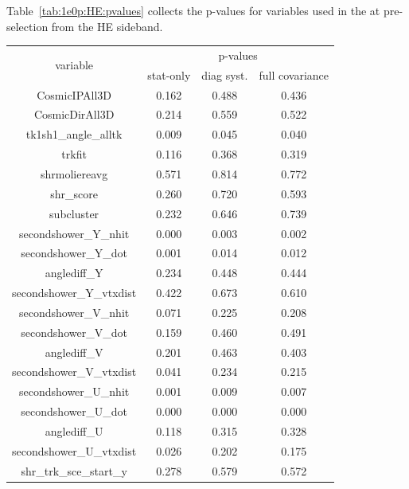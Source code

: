 Table~\ref{tab:1e0p:HE:pvalues} collects the p-values for variables used in the \zpsel at pre-selection from the HE sideband.

\begin{table}[H]
\centering
\setlength{\tabcolsep}{10pt}
\renewcommand{\arraystretch}{1.25}
\begin{tabular}{| c | c | c | c | } 
 \hline
\multirow{2}{*}{variable} & \multicolumn{3}{c|}{p-values} \\
\cline{2-4} & stat-only & diag syst. & full covariance \\ \hline
CosmicIPAll3D & 0.162 & 0.488 & 0.436 \\ \hline
CosmicDirAll3D & 0.214 & 0.559 & 0.522 \\ \hline
tk1sh1\_angle\_alltk & 0.009 & 0.045 & 0.040 \\ \hline
trkfit & 0.116 & 0.368 & 0.319 \\ \hline
shrmoliereavg & 0.571 & 0.814 & 0.772 \\ \hline
shr\_score & 0.260 & 0.720 & 0.593 \\ \hline
subcluster & 0.232 & 0.646 & 0.739 \\ \hline
secondshower\_Y\_nhit & 0.000 & 0.003 & 0.002 \\ \hline
secondshower\_Y\_dot & 0.001 & 0.014 & 0.012 \\ \hline
anglediff\_Y & 0.234 & 0.448 & 0.444 \\ \hline
secondshower\_Y\_vtxdist & 0.422 & 0.673 & 0.610 \\ \hline
secondshower\_V\_nhit & 0.071 & 0.225 & 0.208 \\ \hline
secondshower\_V\_dot & 0.159 & 0.460 & 0.491 \\ \hline
anglediff\_V & 0.201 & 0.463 & 0.403 \\ \hline
secondshower\_V\_vtxdist & 0.041 & 0.234 & 0.215 \\ \hline
secondshower\_U\_nhit & 0.001 & 0.009 & 0.007 \\ \hline
secondshower\_U\_dot & 0.000 & 0.000 & 0.000 \\ \hline
anglediff\_U & 0.118 & 0.315 & 0.328 \\ \hline
secondshower\_U\_vtxdist & 0.026 & 0.202 & 0.175 \\ \hline
shr\_trk\_sce\_start\_y & 0.278 & 0.579 & 0.572 \\ \hline

\end{tabular}
\end{table}
